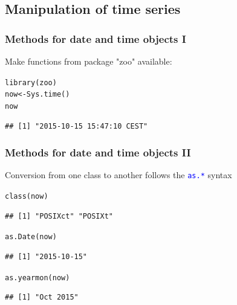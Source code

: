 \documentclass[xcolor=table, xcolor=dvipsnames]{beamer}\usepackage[]{graphicx}\usepackage[]{color}
\makeatletter
\newcommand{\hlstd}[1]{\textcolor[rgb]{0,0,0}{#1}}
\newcommand{\hlkwb}[1]{\textcolor[rgb]{0,0,0}{#1}}
\newcommand{\hlkwd}[1]{\textcolor[rgb]{0,0,1}{#1}}
\newenvironment{kframe}{%
 \def\at@end@of@kframe{}%
 \ifinner\ifhmode%
  \def\at@end@of@kframe{\end{minipage}}%
  \begin{minipage}{\columnwidth}%
 \fi\fi%
 \def\FrameCommand##1{\hskip\@totalleftmargin \hskip-\fboxsep
 \colorbox{shadecolor}{##1}\hskip-\fboxsep
     \hskip-\linewidth \hskip-\@totalleftmargin \hskip\columnwidth}%
 \MakeFramed {\advance\hsize-\width
   \@totalleftmargin\z@ \linewidth\hsize
   \@setminipage}}%
 {\par\unskip\endMakeFramed%
 \at@end@of@kframe}
\newenvironment{knitrout}{}{} %
\newcommand{\rcode}[1]{\texttt{\textcolor{Blue}{#1}}} %
\makeatother
\begin{document}
\subsection{Manipulation of time series}

\begin{frame}[fragile]\frametitle{Methods for date and time objects I}
Make functions from package "zoo" available:
\begin{knitrout}
\color{fgcolor}\begin{kframe}
\begin{alltt}
\hlkwd{library}\hlstd{(zoo)}
\hlstd{now} \hlkwb{<-} \hlkwd{Sys.time}\hlstd{()}
\hlstd{now}
\end{alltt}
\begin{verbatim}
## [1] "2015-10-15 15:47:10 CEST"
\end{verbatim}
\end{kframe}
\end{knitrout}
\end{frame}


\begin{frame}[fragile]\frametitle{Methods for date and time objects II}
Conversion from one class to another follows the \rcode{as.*} syntax
\begin{knitrout}
\color{fgcolor}\begin{kframe}
\begin{alltt}
\hlkwd{class}\hlstd{(now)}
\end{alltt}
\begin{verbatim}
## [1] "POSIXct" "POSIXt"
\end{verbatim}
\begin{alltt}
\hlkwd{as.Date}\hlstd{(now)}
\end{alltt}
\begin{verbatim}
## [1] "2015-10-15"
\end{verbatim}
\begin{alltt}
\hlkwd{as.yearmon}\hlstd{(now)}
\end{alltt}
\begin{verbatim}
## [1] "Oct 2015"
\end{verbatim}
\end{kframe}
\end{knitrout}
\end{frame}
\end{document}
